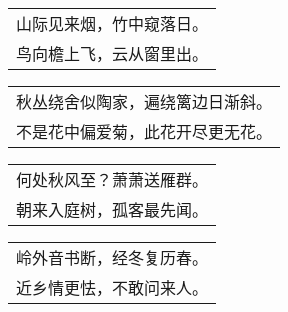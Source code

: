 \nopagebreak%
\nopagebreak%
\noindent\begin{minipage}{\linewidth}
  \vskip-3pt\begin{table}[H]
    \centering
    \begin{tabular}{@{}l@{}}
山际见来烟，竹中窥落日。\\
鸟向檐上飞，云从窗里出。
    \end{tabular}
  \end{table}
\end{minipage}
\vspace{1cm}


\nopagebreak%
\nopagebreak%
\noindent\begin{minipage}{\linewidth}
  \vskip-3pt\begin{table}[H]
    \centering
    \begin{tabular}{@{}l@{}}
秋丛绕舍似陶家，遍绕篱边日渐斜。\\
不是花中偏爱菊，此花开尽更无花。
    \end{tabular}
  \end{table}
\end{minipage}
\vspace{1cm}


\nopagebreak%
\nopagebreak%
\noindent\begin{minipage}{\linewidth}
  \vskip-3pt\begin{table}[H]
    \centering
    \begin{tabular}{@{}l@{}}
何处秋风至？萧萧送雁群。\\
朝来入庭树，孤客最先闻。
    \end{tabular}
  \end{table}
\end{minipage}
\vspace{1cm}


\nopagebreak%
\nopagebreak%
\noindent\begin{minipage}{\linewidth}
  \vskip-3pt\begin{table}[H]
    \centering
    \begin{tabular}{@{}l@{}}
岭外音书断，经冬复历春。\\
近乡情更怯，不敢问来人。
    \end{tabular}
  \end{table}
\end{minipage}
\vspace{1cm}


